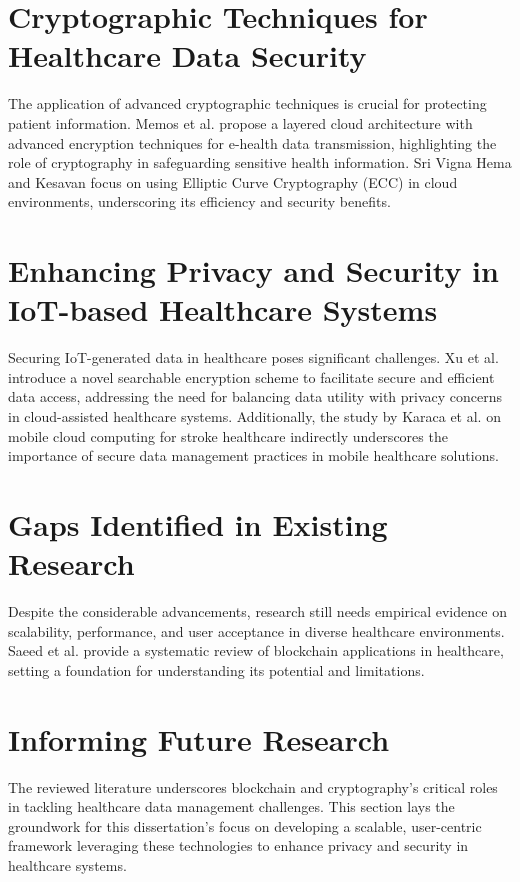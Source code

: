 \documentclass[cic,tc,english]{iiufrgs}
\begin{document}
\section{Cryptographic Techniques for Healthcare Data Security}
The application of advanced cryptographic techniques is crucial for protecting patient information. Memos et al. \cite{Memos2021} propose a layered cloud architecture with advanced encryption techniques for e-health data transmission, highlighting the role of cryptography in safeguarding sensitive health information. Sri Vigna Hema and Kesavan \cite{sri2019} focus on using Elliptic Curve Cryptography (ECC) in cloud environments, underscoring its efficiency and security benefits.

\section{Enhancing Privacy and Security in IoT-based Healthcare Systems}
Securing IoT-generated data in healthcare poses significant challenges. Xu et al. \cite{XuChang2019} introduce a novel searchable encryption scheme to facilitate secure and efficient data access, addressing the need for balancing data utility with privacy concerns in cloud-assisted healthcare systems. Additionally, the study by Karaca et al. \cite{Karaca2019} on mobile cloud computing for stroke healthcare indirectly underscores the importance of secure data management practices in mobile healthcare solutions.

\section{Gaps Identified in Existing Research}
Despite the considerable advancements, research still needs empirical evidence on scalability, performance, and user acceptance in diverse healthcare environments. Saeed et al. \cite{Saeed2022} provide a systematic review of blockchain applications in healthcare, setting a foundation for understanding its potential and limitations.

\section{Informing Future Research}
The reviewed literature underscores blockchain and cryptography's critical roles in tackling healthcare data management challenges. This section lays the groundwork for this dissertation's focus on developing a scalable, user-centric framework leveraging these technologies to enhance privacy and security in healthcare systems.
\end{document}
